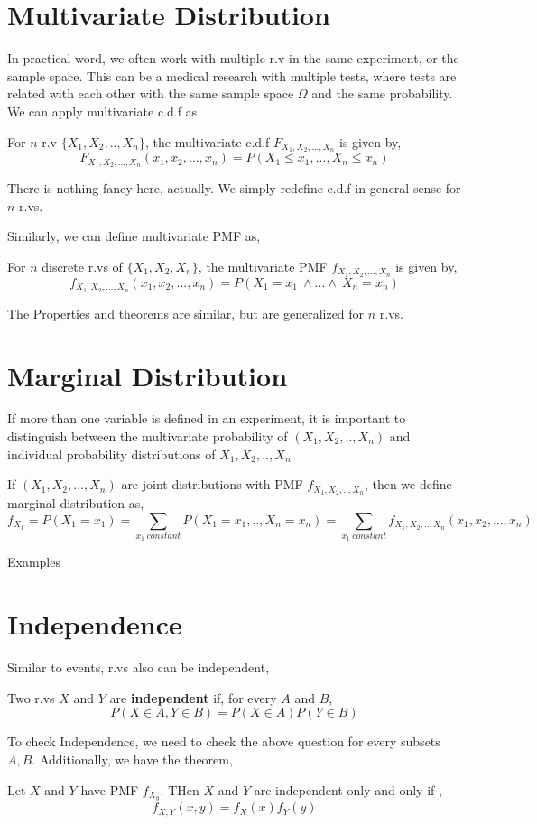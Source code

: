 \section{Multivariate Distribution}
In practical word, we often work with multiple r.v in the same experiment, or the sample space. This can be a medical research with multiple tests, where tests are related with each other with the same sample space $\Omega$ and the same probability.\\
We can apply multivariate c.d.f as
\begin{definition}
    For $n$  r.v $\{ X_1,X_2,..,X_n \}$, the multivariate c.d.f $F_{X_1,X_2,...,X_n}$ is given by,
    \[F_{X_1,X_2,...,X_n}(x_1,x_2,...,x_n) = P(X_1 \le x_1,...,X_n \le x_n) \]
\end{definition}
There is nothing fancy here, actually. We simply redefine c.d.f in general sense for $n$ r.vs.
\par
Similarly, we can define multivariate PMF as,
\begin{definition} For $n$ discrete r.vs of  $\{X_1,X_2,X_n\}$, the multivariate PMF  $f_{X_1,X_2,...,X_n}$ is given by,
    \[ f_{X_1,X_2,...,X_n}(x_1,x_2,...,x_n) = P(X_1=x_1 \ \land ... \land \ X_n = x_n) \]
\end{definition}

The Properties and theorems are similar, but are generalized for $n$ r.vs.

\section{Marginal Distribution}
If more than one variable is defined in an experiment, it is important to distinguish between the multivariate probability of $(X_1,X_2,..,X_n)$ and individual probability distributions of $X_1,X_2,..,X_n$\\

\begin{definition}
    If $(X_1,X_2,...,X_n)$ are joint distributions with PMF $f_{X_1,X_2,..,X_n}$, then we define marginal distribution as,
    \[f_{X_1}= P(X_1 = x_1)= \sum_{x_1 \ constant} P(X_1=x_1,..,X_n=x_n)= \sum_{x_1\ constant} f_{X_1,X_2,..,X_n}(x_1,x_2,...,x_n)\]
\end{definition}
Examples 
\par
\section{Independence}
Similar to events, r.vs also can be independent,
\begin{definition}
    Two r.vs $X$ and $Y$ are \textbf{independent} if, for every $A$ and $B$,
    \[P(X \in A, Y \in B)= P(X \in A)P(Y \in B)\]
\end{definition}
To check Independence, we need to check the above question for every subsets $A,B$. Additionally, we have the theorem,
\begin{theorem}
    Let $X$ and $Y$ have PMF $f_{X_y}$. THen $X$ and $Y$ are independent only and only if ,
    \[f_{X,Y}(x,y)=f_X(x)f_Y(y) \]
\end{theorem}


